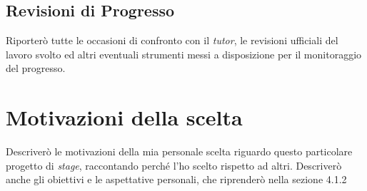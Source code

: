         \subsection{Revisioni di Progresso}
        Riporterò tutte le occasioni di confronto con il \textit{tutor}, le revisioni ufficiali del lavoro svolto ed altri eventuali strumenti messi a disposizione per il monitoraggio del progresso. 
    \section{Motivazioni della scelta}
    Descriverò le motivazioni della mia personale scelta riguardo questo particolare progetto di \textit{stage}, raccontando perché l'ho scelto rispetto ad altri. Descriverò anche gli obiettivi e le aspettative personali, che riprenderò nella sezione 4.1.2
    
        